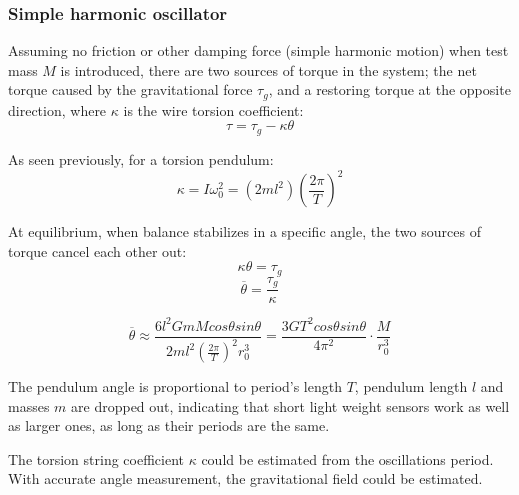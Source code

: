 \documentclass[\main/master.tex]{subfiles}
\begin{document}
\subsubsection{Simple harmonic oscillator}
Assuming no friction or other damping force (simple harmonic motion) when test mass $M$ is introduced, there are two sources of torque in the system; the net torque caused by the gravitational force $\tau_g$, and a restoring torque at the opposite direction, where  $\kappa$ is the wire torsion coefficient:
\begin{equation}
\tau = \tau_g - \kappa\theta     \label{eqn:gravitation_torque}
\end{equation}
\par\noindent
As seen previously, for a torsion pendulum:
\begin{equation}
\kappa = I\omega_0^2 = (2ml^2)(\frac{2\pi}{T})^2     \label{eqn:moment_inertia}
\end{equation} 
\par\noindent
At equilibrium, when balance stabilizes in a specific angle, the two sources of torque cancel each other out:
\begin{equation}
\kappa\theta = \tau_g    \label{eqn:gravitation_torque}
\end{equation}
\begin{equation}
\overline{\theta} = \frac{\tau_g}{\kappa}     \label{eqn:theta average}
\end{equation} 

 

\begin{equation}
\overline{\theta} \approx \frac{6l^2GmMcos\theta sin\theta}{2ml^2 (\frac{2\pi}{T})^2 r_0^3} = \frac{3GT^2cos\theta sin\theta}{4\pi^2 } \cdot \frac{M}{r_0^3}   \label{eqn:theta average}
\end{equation}
\par\noindent
The pendulum angle is proportional to period's length $T$, pendulum length $l$ and masses $m$ are dropped out, indicating that short light weight sensors work as well as larger ones, as long as their periods are the same.
\par\noindent
The torsion string coefficient $\kappa$ could be estimated from the oscillations period. With accurate angle measurement, the gravitational field could be estimated.
 
\end{document}
